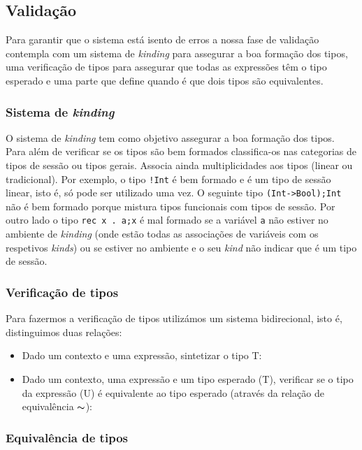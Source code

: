 
\subsection{Validação}

Para garantir que o sistema está isento de erros a nossa fase de validação contempla com um sistema de \textit{kinding} para assegurar a boa formação dos tipos, uma verificação de tipos para assegurar que todas as expressões têm o tipo esperado e uma parte que define quando é que dois tipos são equivalentes.

\subsubsection{Sistema de \textit{kinding}}
O sistema de \textit{kinding} tem como objetivo assegurar a boa formação dos tipos. Para além de verificar se os tipos são bem formados classifica-os nas categorias de tipos de sessão ou tipos gerais. Associa ainda multiplicidades aos tipos (linear ou tradicional).
Por exemplo, o tipo \lstinline|!Int| é bem formado e é um tipo de sessão linear, isto é, só pode ser utilizado uma vez. O seguinte tipo \lstinline|(Int->Bool);Int| não é bem formado porque mistura tipos funcionais com tipos de sessão. Por outro lado o tipo \lstinline|rec x . a;x| é mal formado se a variável \lstinline|a| não estiver no ambiente de \textit{kinding} (onde estão todas as associações de variáveis com os respetivos \textit{kinds}) ou se estiver no ambiente e o seu \textit{kind} não indicar que é um tipo de sessão.

\subsubsection{Verificação de tipos}
Para fazermos a verificação de tipos utilizámos um sistema bidirecional, isto é, distinguimos duas relações:
\begin{itemize}
\item Dado um contexto e uma expressão, sintetizar o tipo T: 
\item Dado um contexto, uma expressão e um tipo esperado (T), verificar se o tipo da expressão (U) é equivalente ao tipo esperado (através da relação de equivalência $\thicksim$):%
    
\end{itemize}

\subsubsection{Equivalência de tipos}


